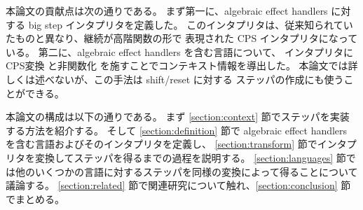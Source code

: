 本論文の貢献点は次の通りである。
まず第一に、algebraic effect handlers に対する big step インタプリタを定義した。
このインタプリタは、従来知られていたものと異なり、継続が高階関数の形で
表現された CPS インタプリタになっている。
第二に、algebraic effect handlers を含む言語について、
インタプリタにCPS変換 \cite{PLOTKIN1975125}と非関数化
\cite{Reynolds1998}を施すことでコンテキスト情報を導出した。
本論文では詳しくは述べないが、この手法は shift/reset に対する
ステッパの作成にも使うことができる。

本論文の構成は以下の通りである。
まず \ref{section:context} 節でステッパを実装する方法を紹介する。
そして \ref{section:definition} 節で algebraic effect handlers を含む言語およびそのインタプリタを定義し、
\ref{section:transform} 節でインタプリタを変換してステッパを得るまでの過程を説明する。
\ref{section:languages} 節では他のいくつかの言語に対するステッパを同様の変換によって得ることについて議論する。
\ref{section:related} 節で関連研究について触れ、\ref{section:conclusion} 節でまとめる。
